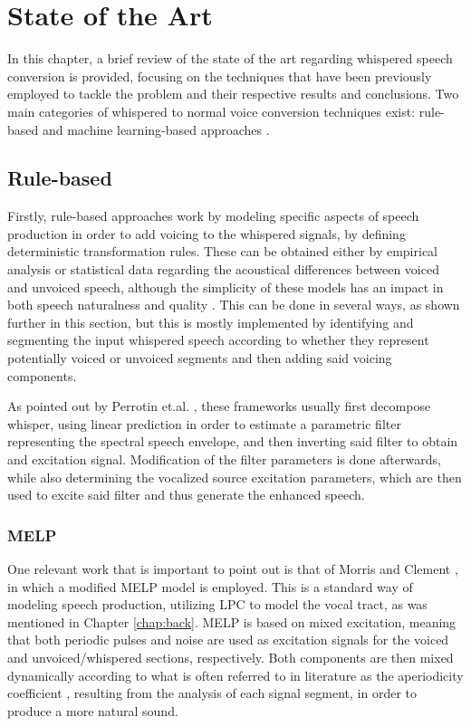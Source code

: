 \chapter{State of the Art} \label{chap:sota}

In this chapter, a brief review of the state of the art regarding whispered speech conversion  is provided, focusing on the techniques that have been previously employed to tackle the problem and their respective results and conclusions. Two main categories of whispered to normal voice conversion techniques exist: rule-based and machine learning-based approaches \cite{perrotinGlottalFlowSynthesis2020}.

\section{Rule-based}

Firstly, rule-based approaches work by modeling specific aspects of speech production in order to add voicing to the whispered signals, by defining deterministic transformation rules. These can be obtained either by empirical analysis or statistical data regarding the acoustical differences between voiced and unvoiced speech, although the simplicity of these models has an impact in both speech naturalness and quality \cite{lianWhisperNormalSpeech2019}. This can be done in several ways, as shown further in this section, but this is mostly implemented by identifying and segmenting the input whispered speech according to whether they represent potentially voiced or unvoiced segments and then adding said voicing components.

As pointed out by Perrotin et.al. \cite{perrotinGlottalFlowSynthesis2020}, these frameworks usually first decompose whisper, using linear prediction in order to estimate a parametric filter representing the spectral speech envelope, and then inverting said filter to obtain and excitation signal. Modification of the filter parameters is done afterwards, while also determining the vocalized source excitation parameters, which are then used to excite said filter and thus generate the enhanced speech.

\subsection{MELP}

One relevant work that is important to point out is that of Morris and Clement \cite{morrisReconstructionSpeechWhispers2002a}, in which a modified MELP model is employed. This is a standard way of modeling speech production, utilizing LPC to model the vocal tract, as was mentioned in Chapter \ref{chap:back}. MELP is based on mixed excitation, meaning that both periodic pulses and noise are used as excitation signals for the voiced and unvoiced/whispered sections, respectively. Both components are then mixed dynamically according to what is often referred to in literature as the aperiodicity coefficient \cite{perrotinGlottalFlowSynthesis2020}, resulting from the analysis of each signal segment, in order to produce a more natural sound. 

